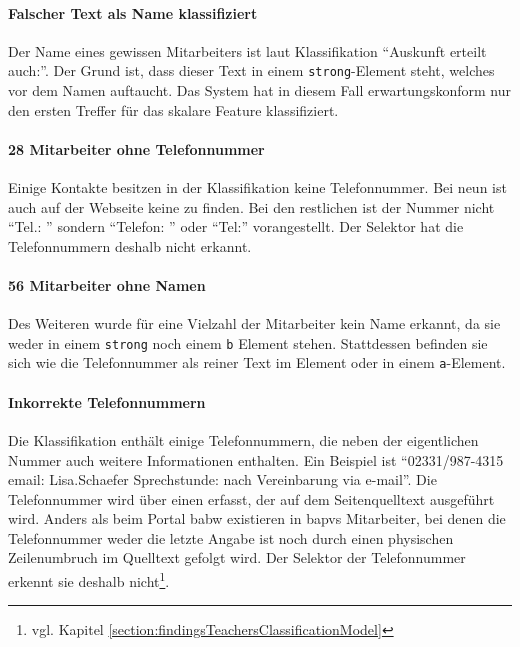     \paragraph{Falscher Text als Name klassifiziert}
    Der Name eines gewissen Mitarbeiters ist laut Klassifikation
    "`Auskunft erteilt auch:"'.
    Der Grund ist, dass dieser Text in einem \texttt{strong}-Element steht,
    welches vor dem Namen auftaucht.
    Das System hat in diesem Fall erwartungskonform nur den ersten
    Treffer für das skalare Feature klassifiziert.
        
    \paragraph{28 Mitarbeiter ohne Telefonnummer}
    Einige Kontakte besitzen in der Klassifikation keine Telefonnummer.
    Bei neun ist auch auf der Webseite keine zu finden.
    Bei den restlichen ist der Nummer nicht "`Tel.: "'
    sondern "`Telefon: "' oder "`Tel:"' vorangestellt.
    Der Selektor hat die Telefonnummern deshalb nicht erkannt.
    
    \paragraph{56 Mitarbeiter ohne Namen}
    Des Weiteren wurde für eine Vielzahl der Mitarbeiter kein Name erkannt,
    da sie weder in einem \texttt{strong} noch einem \texttt{b} Element stehen.
    Stattdessen befinden sie sich wie die Telefonnummer als reiner Text im Element
    oder in einem \texttt{a}-Element.

    \paragraph{Inkorrekte Telefonnummern}
    Die Klassifikation enthält einige Telefonnummern,
    die neben der eigentlichen Nummer auch weitere Informationen enthalten.
    Ein Beispiel ist "`02331/987-4315 email: Lisa.Schaefer Sprechstunde: nach Vereinbarung via e-mail"'.
    Die Telefonnummer wird über einen {\xpathSelector} erfasst,
    der auf dem Seitenquelltext ausgeführt wird.
    Anders als beim Portal \gls{babw} existieren in \gls{bapvs} Mitarbeiter,
    bei denen die Telefonnummer weder die letzte Angabe ist
    noch durch einen physischen Zeilenumbruch im Quelltext gefolgt wird.
    Der Selektor der Telefonnummer erkennt sie deshalb
    nicht\footnote{vgl. Kapitel \ref{section:findingsTeachersClassificationModel}}.


